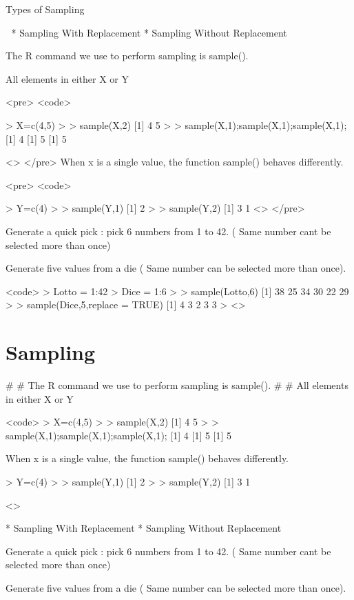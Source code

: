 \documentclass[a4paper,12pt]{article}
\begin{document}
Types of Sampling
\begin{itemize}
	* Sampling With Replacement
	* Sampling Without Replacement
\end{itemize}

The R command we use to perform sampling is sample().

All elements in either X or Y

<pre>
	<code>
	
	
	> X=c(4,5)
	>
	> sample(X,2)
	[1] 4 5
	>
	> sample(X,1);sample(X,1);sample(X,1);
	[1] 4
	[1] 5
	[1] 5
	
	<\code>
</pre>
When x is a single value, the function sample() behaves differently.

<pre>
	<code>
	
	> Y=c(4)
	>
	> sample(Y,1)
	[1] 2
	> 
	> sample(Y,2)
	[1] 3 1
	<\code>
</pre>


Generate a quick pick : pick 6 numbers from 1 to 42. ( Same number cant be selected more than once)

Generate five values from a die ( Same number can be selected more than once).

<code>
> Lotto = 1:42
> Dice = 1:6
> 
> sample(Lotto,6)
[1] 38 25 34 30 22 29
> 
> sample(Dice,5,replace = TRUE)
[1] 4 3 2 3 3
>
<\code>
\section{Sampling}
# 
# The R command we use to perform sampling is sample().
# 
# All elements in either X or Y



<code>
> X=c(4,5)
>
> sample(X,2)
[1] 4 5
>
> sample(X,1);sample(X,1);sample(X,1);
[1] 4
[1] 5
[1] 5

When x is a single value, the function sample() behaves differently.

> Y=c(4)
>
> sample(Y,1)
[1] 2
> 
> sample(Y,2)
[1] 3 1

<\code>

\begin{itemize}
	* Sampling With Replacement
	* Sampling Without Replacement
\end{itemize}
Generate a quick pick : pick 6 numbers from 1 to 42. ( Same number cant be selected more than once)

Generate five values from a die ( Same number can be selected more than once).
\end{document}
